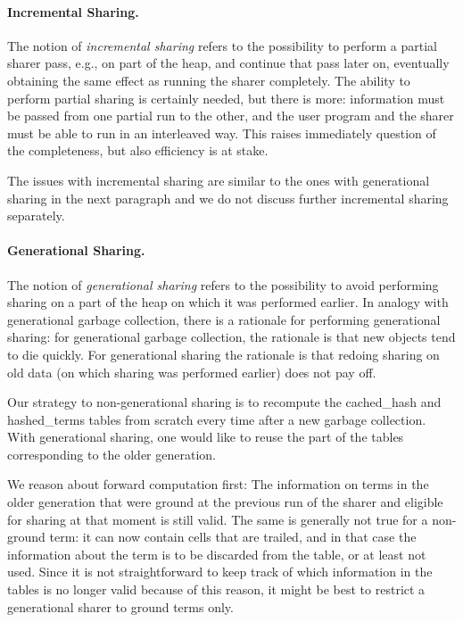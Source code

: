 \documentclass{tlp}
\begin{document}
\paragraph{\bf Incremental Sharing.}

The notion of {\em incremental sharing} refers to the possibility to
perform a partial sharer pass, e.g., on part of the heap, and
continue that pass later on, eventually obtaining the same effect as
running the sharer completely. The ability to perform partial sharing
is certainly needed, but there is more: information must be passed
from one partial run to the other, and the user program and the sharer must
be able to run in an interleaved way. This raises immediately question
of the completeness, but also efficiency is at stake.

The issues with incremental sharing are similar to the ones with
generational sharing in the next paragraph and we do not discuss
further incremental sharing separately.


\paragraph{\bf Generational Sharing.}

The notion of {\em generational sharing} refers to the possibility to
avoid performing sharing on a part of the heap on which it was
performed earlier. In analogy with generational garbage collection,
there is a rationale for performing generational sharing: for
generational garbage collection, the rationale is that new objects
tend to die quickly. For generational sharing the rationale is that
redoing sharing on old data (on which sharing was performed earlier)
does not pay off.


\begin{sloppypar}
Our strategy to non-generational sharing is to recompute the
cached\_hash and hashed\_terms tables from scratch every time after a
new garbage collection. With generational sharing, one would like to
reuse the part of the tables corresponding to the older generation.
\end{sloppypar}


We reason about forward computation first: The information on terms in
the older generation that were ground at the previous run of the
sharer and eligible for sharing at that moment is still valid. The
same is generally not true for a non-ground term: it can now contain
cells that are trailed, and in that case the information about the
term is to be discarded from the table, or at least not used. Since it
is not straightforward to keep track of which information in the tables
is no longer valid because of this reason, it might be best to
restrict a generational sharer to ground terms only.
\end{document}
